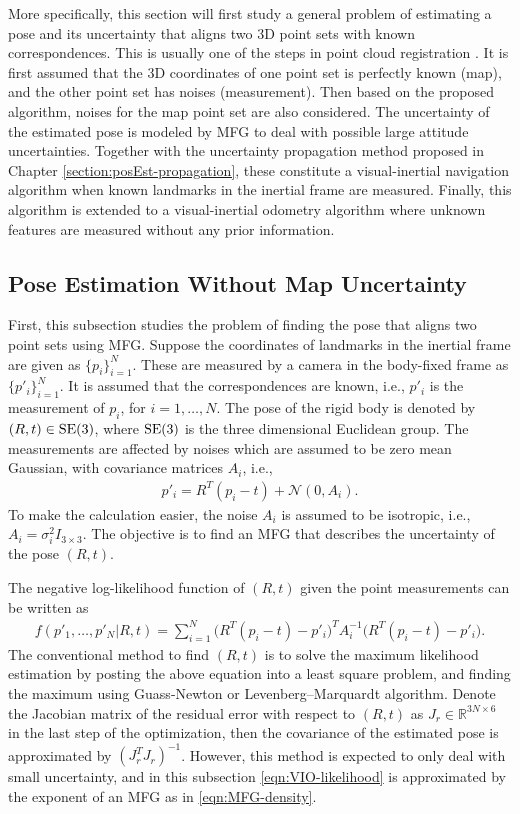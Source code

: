 More specifically, this section will first study a general problem of estimating a pose and its uncertainty that aligns two 3D point sets with known correspondences.
This is usually one of the steps in point cloud registration \cite{huang2021comprehensive}.
It is first assumed that the 3D coordinates of one point set is perfectly known (map), and the other point set has noises (measurement).
Then based on the proposed algorithm, noises for the map point set are also considered.
The uncertainty of the estimated pose is modeled by MFG to deal with possible large attitude uncertainties.
Together with the uncertainty propagation method proposed in Chapter \ref{section:posEst-propagation}, these constitute a visual-inertial navigation algorithm when known landmarks in the inertial frame are measured.
Finally, this algorithm is extended to a visual-inertial odometry algorithm where unknown features are measured without any prior information.

\subsection{Pose Estimation Without Map Uncertainty} \label{section:VIO-pose}

First, this subsection studies the problem of finding the pose that aligns two point sets using MFG.
Suppose the coordinates of landmarks in the inertial frame are given as $\{p_i\}_{i=1}^N$.
These are measured by a camera in the body-fixed frame as $\{p'_i\}_{i=1}^N$.
It is assumed that the correspondences are known, i.e., $p'_i$ is the measurement of $p_i$, for $i = 1,\ldots,N$.
The pose of the rigid body is denoted by $(R,t)\in\mathrm{SE}(3)$, where $\mathrm{SE}(3)$ is the three dimensional Euclidean group.
The measurements are affected by noises which are assumed to be zero mean Gaussian, with covariance matrices $A_i$, i.e.,
\begin{align}
	p'_i = R^T(p_i-t) + \mathcal{N}(0,A_i).
\end{align}
To make the calculation easier, the noise $A_i$ is assumed to be isotropic, i.e., $A_i = \sigma_i^2I_{3\times 3}$.
The objective is to find an MFG that describes the uncertainty of the pose $(R,t)$.

The negative log-likelihood function of $(R,t)$ given the point measurements can be written as
\begin{align} \label{eqn:VIO-likelihood}
	f(p'_1,\ldots,p'_N | R,t) = \sum_{i=1}^N \big(R^T(p_i-t)-p'_i\big)^T A_i^{-1} \big(R^T(p_i-t)-p'_i\big).
\end{align}
The conventional method to find $(R,t)$ is to solve the maximum likelihood estimation by posting the above equation into a least square problem, and finding the maximum using Guass-Newton or Levenberg–Marquardt algorithm.
Denote the Jacobian matrix of the residual error with respect to $(R,t)$ as $J_r\in\mathbb{R}^{3N\times 6}$ in the last step of the optimization, then the covariance of the estimated pose is approximated by $(J_r^TJ_r)^{-1}$.
However, this method is expected to only deal with small uncertainty, and in this subsection \eqref{eqn:VIO-likelihood} is approximated by the exponent of an MFG as in \eqref{eqn:MFG-density}.

